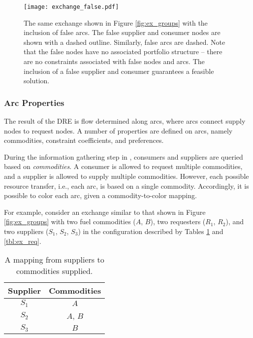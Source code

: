 \begin{figure}
  \begin{center}
    \texttt{[image: exchange\_false.pdf]}
    \caption{The same exchange shown in Figure \ref{fig:ex_groups} with the
      inclusion of false arcs. The false supplier and consumer nodes are shown
      with a dashed outline. Similarly, false arcs are dashed. Note that the
      false nodes have no associated portfolio structure -- there are no
      constraints associated with false nodes and arcs. The inclusion of a false
      supplier and consumer guarantees a feasible solution.}
    \label{fig:ex_false}
  \end{center}
\end{figure}

\subsubsection{Arc Properties}\label{abm:dre:fctp:arcs}

The result of the DRE is flow determined along arcs, where arcs connect supply
nodes to request nodes. A number of properties are defined on arcs, namely
commodities, constraint coefficients, and preferences.


During the information gathering step in , consumers and
suppliers are queried based on \textit{commodities}. A consumer is allowed to
request multiple commodities, and a supplier is allowed to supply multiple
commodities. However, each possible resource transfer, i.e., each arc, is based
on a single commodity. Accordingly, it is possible to color each arc, given a
commodity-to-color mapping.

For example, consider an exchange similar to that shown in Figure
\ref{fig:ex_groups} with two fuel commodities ($A$, $B$), two requesters ($R_1$,
$R_2$), and two suppliers ($S_1$, $S_2$, $S_3$) in the configuration described
by Tables \ref{tbl:ex_sup} and \ref{tbl:ex_req}.

\begin{table}[h]
\centering
\begin{tabular}{c|c}
Supplier & Commodities \\ \hline
$S_1$             & $A$         \\
$S_2$             & $A$, $B$    \\
$S_3$             & $B$         \\
\end{tabular}
\caption{A mapping from suppliers to commodities supplied.}
\label{tbl:ex_sup}
\end{table}


